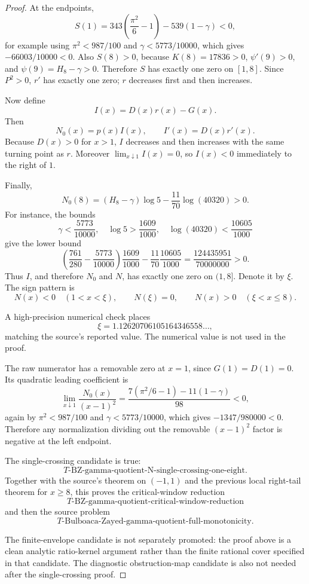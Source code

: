 \documentclass[11pt]{article}
\numberwithin{equation}{section}
\theoremstyle{definition}
\theoremstyle{remark}
\newcommand{\1}{\mathbf 1}
\begin{document}
\begin{proof}
At the endpoints,
\[
S(1)=343\left(\frac{\pi^2}{6}-1\right)-539(1-\gamma)<0,
\]
for example using \(\pi^2<987/100\) and \(\gamma<5773/10000\), which gives
\(-66003/10000<0\).  Also \(S(8)>0\), because \(K(8)=17836>0\),
\(\psi'(9)>0\), and \(\psi(9)=H_8-\gamma>0\).  Therefore \(S\) has exactly
one zero on \([1,8]\).  Since \(P^2>0\), \(r'\) has exactly one zero; \(r\)
decreases first and then increases.

Now define
\[
I(x)=D(x)r(x)-G(x).
\]
Then
\[
N_0(x)=p(x)I(x),\qquad I'(x)=D(x)r'(x).
\]
Because \(D(x)>0\) for \(x>1\), \(I\) decreases and then increases with the
same turning point as \(r\).  Moreover \(\lim_{x\downarrow1}I(x)=0\), so
\(I(x)<0\) immediately to the right of \(1\).

Finally,
\[
N_0(8)=(H_8-\gamma)\log5-\frac{11}{70}\log(40320)>0.
\]
For instance, the bounds
\[
\gamma<\frac{5773}{10000},\quad \log5>\frac{1609}{1000},
\quad \log(40320)<\frac{10605}{1000}
\]
give the lower bound
\[
\left(\frac{761}{280}-\frac{5773}{10000}\right)\frac{1609}{1000}
-\frac{11}{70}\frac{10605}{1000}
=\frac{124435951}{70000000}>0.
\]
Thus \(I\), and therefore \(N_0\) and \(N\), has exactly one zero on
\((1,8]\).  Denote it by \(\xi\).  The sign pattern is
\[
N(x)<0\quad(1<x<\xi),\qquad
N(\xi)=0,\qquad
N(x)>0\quad(\xi<x\le8).
\]

A high-precision numerical check places
\[
\xi=1.12620706105164346558\ldots,
\]
matching the source's reported value.  The numerical value is not used in the
proof.

The raw numerator has a removable zero at \(x=1\), since \(G(1)=D(1)=0\).  Its
quadratic leading coefficient is
\[
\lim_{x\downarrow1}\frac{N_0(x)}{(x-1)^2}
=
\frac{7(\pi^2/6-1)-11(1-\gamma)}{98}<0,
\]
again by \(\pi^2<987/100\) and \(\gamma<5773/10000\), which gives
\(-1347/980000<0\).  Therefore any normalization dividing out the removable
\((x-1)^2\) factor is negative at the left endpoint.

The single-crossing candidate is true:
\[
T\text{-BZ-gamma-quotient-N-single-crossing-one-eight}.
\]
Together with the source's theorem on \((-1,1)\) and the previous local
right-tail theorem for \(x\ge8\), this proves the critical-window reduction
\[
T\text{-BZ-gamma-quotient-critical-window-reduction}
\]
and then the source problem
\[
T\text{-Bulboaca-Zayed-gamma-quotient-full-monotonicity}.
\]

The finite-envelope candidate is not separately promoted: the proof above is a
clean analytic ratio-kernel argument rather than the finite rational cover
specified in that candidate.  The diagnostic obstruction-map candidate is also
not needed after the single-crossing proof.
\end{proof}
\end{document}
